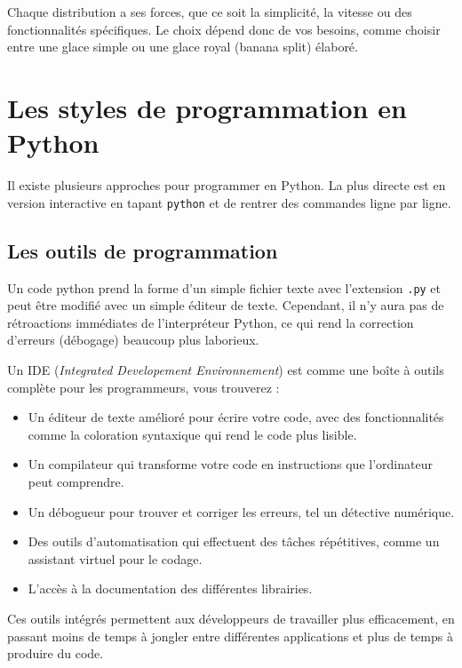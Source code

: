 \documentclass[
  11pt,
  letterpaper,
  open=any,
  twoside=false,
  french]{scrbook}
\begin{document}
Chaque distribution a ses forces, que ce soit la simplicité, la vitesse
ou des fonctionnalités spécifiques. Le choix dépend donc de vos besoins,
comme choisir entre une glace simple ou une glace royal (banana split)
élaboré.

\section{Les styles de programmation en
Python}\label{les-styles-de-programmation-en-python}

Il existe plusieurs approches pour programmer en Python. La plus directe
est en version interactive en tapant \texttt{python} et de rentrer des
commandes ligne par ligne.

\subsection{Les outils de
programmation}\label{les-outils-de-programmation}

Un code python prend la forme d'un simple fichier texte avec l'extension
\texttt{.py} et peut être modifié avec un simple éditeur de texte.
Cependant, il n'y aura pas de rétroactions immédiates de l'interpréteur
Python, ce qui rend la correction d'erreurs (débogage) beaucoup plus
laborieux.

Un IDE (\emph{Integrated Developement Environnement}) est comme une
boîte à outils complète pour les programmeurs, vous trouverez :

\begin{itemize}
\item
  Un éditeur de texte amélioré pour écrire votre code, avec des
  fonctionnalités comme la coloration syntaxique qui rend le code plus
  lisible.
\item
  Un compilateur qui transforme votre code en instructions que
  l'ordinateur peut comprendre.
\item
  Un débogueur pour trouver et corriger les erreurs, tel un détective
  numérique.
\item
  Des outils d'automatisation qui effectuent des tâches répétitives,
  comme un assistant virtuel pour le codage.
\item
  L'accès à la documentation des différentes librairies.
\end{itemize}

Ces outils intégrés permettent aux développeurs de travailler plus
efficacement, en passant moins de temps à jongler entre différentes
applications et plus de temps à produire du code.
\end{document}
